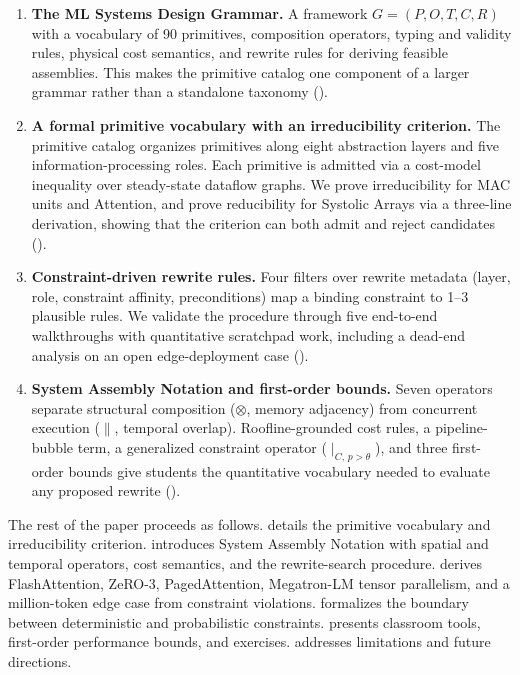 \documentclass[10pt,twocolumn]{article}
\begin{document}
\begin{enumerate}[nosep, leftmargin=*, label=\textbf{C\arabic*.}]
\item \textbf{The ML Systems Design Grammar.} A framework $G=(P,O,T,C,R)$ with a vocabulary of 90 primitives, composition operators, typing and validity rules, physical cost semantics, and rewrite rules for deriving feasible assemblies. This makes the primitive catalog one component of a larger grammar rather than a standalone taxonomy ().

\item \textbf{A formal primitive vocabulary with an irreducibility criterion.} The primitive catalog organizes primitives along eight abstraction layers and five information-processing roles. Each primitive is admitted via a cost-model inequality over steady-state dataflow graphs. We prove irreducibility for MAC units and Attention, and prove reducibility for Systolic Arrays via a three-line derivation, showing that the criterion can both admit and reject candidates ().

\item \textbf{Constraint-driven rewrite rules.} Four filters over rewrite metadata (layer, role, constraint affinity, preconditions) map a binding constraint to 1--3 plausible rules. We validate the procedure through five end-to-end walkthroughs with quantitative scratchpad work, including a dead-end analysis on an open edge-deployment case ().

\item \textbf{System Assembly Notation and first-order bounds.} Seven operators separate structural composition ($\otimes$, memory adjacency) from concurrent execution ($\parallel$, temporal overlap). Roofline-grounded cost rules, a pipeline-bubble term, a generalized constraint operator ($\mid_{C,\, p > \theta}$), and three first-order bounds give students the quantitative vocabulary needed to evaluate any proposed rewrite ().
\end{enumerate}

The rest of the paper proceeds as follows.  details the primitive vocabulary and irreducibility criterion.  introduces System Assembly Notation with spatial and temporal operators, cost semantics, and the rewrite-search procedure.  derives FlashAttention, ZeRO-3, PagedAttention, Megatron-LM tensor parallelism, and a million-token edge case from constraint violations.  formalizes the boundary between deterministic and probabilistic constraints.  presents classroom tools, first-order performance bounds, and exercises.  addresses limitations and future directions.
\end{document}
